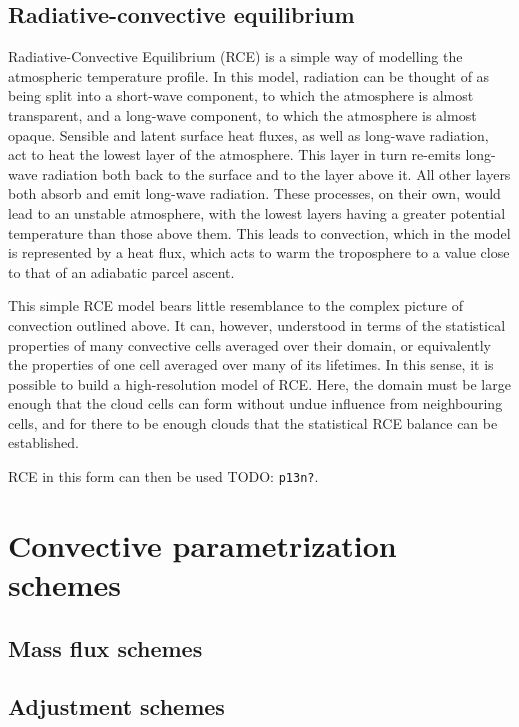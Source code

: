 \documentclass[11pt,a4paper]{article}
\newcommand{\todo}{TODO: \texttt}
\begin{document}
\subsection{Radiative-convective equilibrium}

Radiative-Convective Equilibrium (RCE) is a simple way of modelling the atmospheric temperature profile. In this model, radiation can be thought of as being split into a short-wave component, to which the atmosphere is almost transparent, and a long-wave component, to which the atmosphere is almost opaque. Sensible and latent surface heat fluxes, as well as long-wave radiation, act to heat the lowest layer of the atmosphere. This layer in turn re-emits long-wave radiation both back to the surface and to the layer above it. All other layers both absorb and emit long-wave radiation. These processes, on their own, would lead to an unstable atmosphere, with the lowest layers having a greater potential temperature than those above them. This leads to convection, which in the model is represented by a heat flux, which acts to warm the troposphere to a value close to that of an adiabatic parcel ascent.

This simple RCE model bears little resemblance to the complex picture of convection outlined above. It can, however, understood in terms of the statistical properties of many convective cells averaged over their domain, or equivalently the properties of one cell averaged over many of its lifetimes. In this sense, it is possible to build a high-resolution model of RCE. Here, the domain must be large enough that the cloud cells can form without undue influence from neighbouring cells, and for there to be enough clouds that the statistical RCE balance can be established. 

RCE in this form can then be used \todo{p13n?}.

\section{Convective parametrization schemes}

\subsection{Mass flux schemes}

\cite{kain1993convective}

\subsection{Adjustment schemes}

\cite{manabe1965simulated}

\cite{betts1986new}

\newpage
\printbibliography[title={References}]

\end{document}
